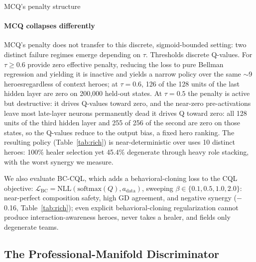 \documentclass[journal]{IEEEtran}
\providecommand{\DIFaddtex}[1]{{\protect\color{blue} \sf #1}} %
\providecommand{\DIFdeltex}[1]{{\protect\color{red} \scriptsize #1}} %
\providecommand{\DIFaddbegin}{} %
\providecommand{\DIFaddend}{} %
\providecommand{\DIFdelbegin}{} %
\providecommand{\DIFdelend}{} %
\providecommand{\DIFadd}[1]{\texorpdfstring{\DIFaddtex{#1}}{#1}} %
\providecommand{\DIFdel}[1]{\texorpdfstring{\DIFdeltex{#1}}{}} %
\begin{document}
\DIFdel{MCQ's penalty structure }\DIFdelend \DIFaddbegin \paragraph{\DIFadd{MCQ collapses differently}} \DIFadd{MCQ's penalty }\DIFaddend does not transfer to \DIFdelbegin \DIFdel{this discrete, }\DIFdelend sigmoid-bounded \DIFdelbegin \DIFdel{setting: two distinct failure regimes emerge depending on $\tau$. Thresholds }\DIFdelend \DIFaddbegin \DIFadd{discrete Q-values. For }\DIFaddend $\tau \geq 0.6$ \DIFdelbegin \DIFdel{provide zero effective penalty, reducing the loss to pure Bellman regression and yielding }\DIFdelend \DIFaddbegin \DIFadd{it is inactive and yields }\DIFaddend a narrow policy over the same \DIFdelbegin \DIFdel{$\sim$9 heroesregardless of context}\DIFdelend \DIFaddbegin \DIFadd{8 heroes; at $\tau = 0.6$, 126 of the 128 units of the last hidden layer are zero on 200,000 held-out states}\DIFaddend . At $\tau = 0.5$ \DIFdelbegin \DIFdel{the penalty is active but destructive: it drives Q-values toward zero, and the near-zero pre-activations leave most late-layer neurons permanently dead}\DIFdelend \DIFaddbegin \DIFadd{it drives Q toward zero: all 128 units of the third hidden layer and 255 of 256 of the second are zero on those states, so the Q-values reduce to the output bias, a fixed hero ranking}\DIFaddend . The resulting policy \DIFdelbegin \DIFdel{(Table~\ref{tab:rich}) is near-deterministic over }\DIFdelend \DIFaddbegin \DIFadd{uses }\DIFaddend 10 \DIFdelbegin \DIFdel{distinct heroes: 100\% healer selection yet 45.4\% degenerate through heavy role stacking, with the worst synergy we measure.
}%

\DIFdel{We also evaluate BC-CQL, which adds a behavioral-cloning loss to the CQL objective: $\mathcal{L}_\text{BC} = \text{NLL}(\text{softmax}(Q), a_\text{data})$, sweeping $\beta \in \{0.1, 0.5, 1.0, 2.0\}$: near-perfect composition safety, high GD agreement, and negative synergy ($-$0.16, Table~\ref{tab:rich}); even explicit behavioral-cloning regularization cannot produce interaction-awareness}\DIFdelend \DIFaddbegin \DIFadd{heroes, never takes a healer, and fields only degenerate teams}\DIFaddend .

\DIFdelbegin \subsection{\DIFdel{The Professional-Manifold Discriminator}}
\addtocounter{subsection}{-1}%
\end{document}
